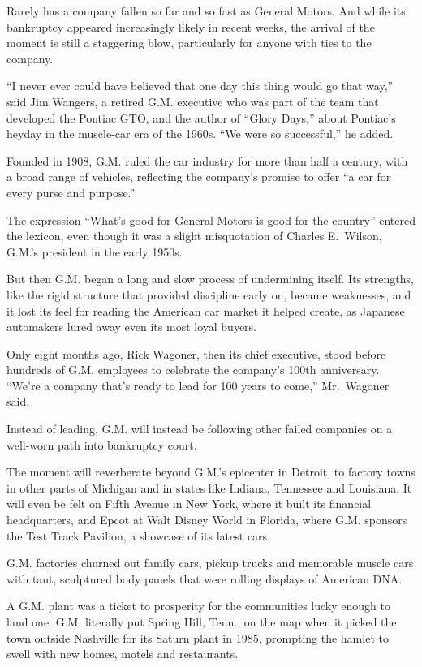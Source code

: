 \documentclass[12pt,a4paper,onecolumn]{article}
\begin{document}
Rarely has a company fallen so far and so fast as General Motors. And while its bankruptcy appeared
increasingly likely in recent weeks, the arrival of the moment is still a staggering blow,
particularly for anyone with ties to the company.

``I never ever could have believed that one day this thing would go that way,'' said Jim Wangers, a
retired G.M. executive who was part of the team that developed the Pontiac GTO, and the author of
``Glory Days,'' about Pontiac's heyday in the muscle-car era of the 1960s. ``We were so
successful,'' he added.

Founded in 1908, G.M. ruled the car industry for more than half a century, with a broad range of
vehicles, reflecting the company's promise to offer ``a car for every purse and purpose.''

The expression ``What's good for General Motors is good for the country'' entered the lexicon, even
though it was a slight misquotation of Charles E.~Wilson, G.M.'s president in the early 1950s.

But then G.M. began a long and slow process of undermining itself. Its strengths, like the rigid
structure that provided discipline early on, became weaknesses, and it lost its feel for reading the
American car market it helped create, as Japanese automakers lured away even its most loyal buyers.

Only eight months ago, Rick Wagoner, then its chief executive, stood before hundreds of G.M.
employees to celebrate the company's 100th anniversary. ``We're a company that's ready to lead for
100 years to come,'' Mr.~Wagoner said.

Instead of leading, G.M. will instead be following other failed companies on a well-worn path into
bankruptcy court.

The moment will reverberate beyond G.M.'s epicenter in Detroit, to factory towns in other parts of
Michigan and in states like Indiana, Tennessee and Louisiana. It will even be felt on Fifth Avenue
in New York, where it built its financial headquarters, and Epcot at Walt Disney World in Florida,
where G.M. sponsors the Test Track Pavilion, a showcase of its latest cars.

G.M. factories churned out family cars, pickup trucks and memorable muscle cars with taut,
sculptured body panels that were rolling displays of American DNA.

A G.M. plant was a ticket to prosperity for the communities lucky enough to land one. G.M. literally
put Spring Hill, Tenn., on the map when it picked the town outside Nashville for its Saturn plant in
1985, prompting the hamlet to swell with new homes, motels and restaurants.
\end{document}
